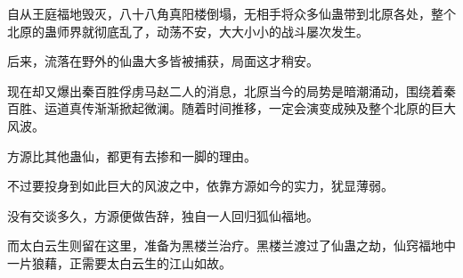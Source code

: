 \begin{this_body}
自从王庭福地毁灭，八十八角真阳楼倒塌，无相手将众多仙蛊带到北原各处，整个北原的蛊师界就彻底乱了，动荡不安，大大小小的战斗屡次发生。

后来，流落在野外的仙蛊大多皆被捕获，局面这才稍安。

现在却又爆出秦百胜俘虏马赵二人的消息，北原当今的局势是暗潮涌动，围绕着秦百胜、运道真传渐渐掀起微澜。随着时间推移，一定会演变成殃及整个北原的巨大风波。

方源比其他蛊仙，都更有去掺和一脚的理由。

不过要投身到如此巨大的风波之中，依靠方源如今的实力，犹显薄弱。

没有交谈多久，方源便做告辞，独自一人回归狐仙福地。

而太白云生则留在这里，准备为黑楼兰治疗。黑楼兰渡过了仙蛊之劫，仙窍福地中一片狼藉，正需要太白云生的江山如故。

\end{this_body}

